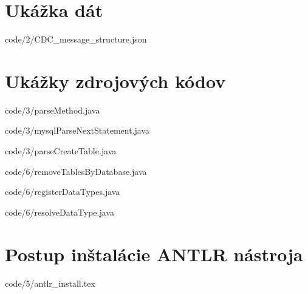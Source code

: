 \appendix	
\printnomenclature
\label{apx:zkratky}
\chapter{Ukážka dát}


            {code/2/CDC_message_structure.json}

\chapter{Ukážky zdrojových kódov}


            {code/3/parseMethod.java}


            {code/3/mysqlParseNextStatement.java}


            {code/3/parseCreateTable.java}
           

            {code/6/removeTablesByDatabase.java}
            

            {code/6/registerDataTypes.java}


            {code/6/resolveDataType.java}

\chapter{Postup inštalácie ANTLR nástroja}


            {code/5/antlr_install.tex}

